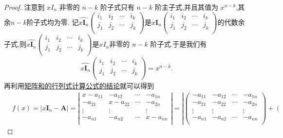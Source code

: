 \documentclass[../../main.tex]{subfiles}%
\begin{document}
\begin{proof}

注意到 \(xI_{n}\) 非零的 \(n - k\) 阶子式只有 \(n - k\) 阶主子式,并且其值为 \(x^{n - k}\),其余$n-k$阶子式均为零.
记$\widehat{x\boldsymbol{I}_n}\left( \begin{matrix}
i_1&		i_2&		\cdots&		i_k\\
j_1&		j_2&		\cdots&		j_k\\
\end{matrix} \right)$是$x\boldsymbol{I}_n\left( \begin{matrix}
i_1&		i_2&		\cdots&		i_k\\
j_1&		j_2&		\cdots&		j_k\\
\end{matrix} \right)$的代数余子式,则$\widehat{x\boldsymbol{I}_n}\left( \begin{matrix}
i_1&		i_2&		\cdots&		i_k\\
j_1&		j_2&		\cdots&		j_k\\
\end{matrix} \right)$是\(xI_{n}\)非零的 \(n - k\) 阶子式.于是我们有
\begin{align*}
\widehat{x\boldsymbol{I}_n}\left( \begin{matrix}
i_1&		i_2&		\cdots&		i_k\\
j_1&		j_2&		\cdots&		j_k\\
\end{matrix} \right) =x^{n-k}.
\end{align*}
再利用\hyperref[proposition:矩阵和的行列式计算公式]{矩阵和的行列式计算公式的结论}就可以得到
\begin{align*}
&f(x)=|x\boldsymbol{I}_n-\boldsymbol{A}|=\left| \begin{matrix}
x-a_{11}&		-a_{12}&		\cdots&		-a_{1n}\\
-a_{21}&		x-a_{22}&		\cdots&		-a_{2n}\\
\vdots&		\vdots&		&		\vdots\\
-a_{n1}&		-a_{n2}&		\cdots&		x-a_{nn}\\
\end{matrix} \right|=\left| \left( \begin{matrix}
-a_{11}&		-a_{12}&		\cdots&		-a_{1n}\\
-a_{21}&		-a_{22}&		\cdots&		-a_{2n}\\
\vdots&		\vdots&		&		\vdots\\
-a_{n1}&		-a_{n2}&		\cdots&		-a_{nn}\\
\end{matrix} \right) +\left( \begin{matrix}

\end{matrix}
\end{align*}
\end{proof}
\end{document}
